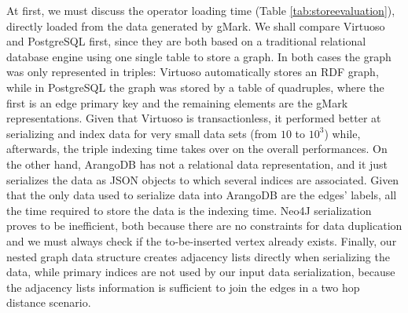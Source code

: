 At first, we must discuss the operator loading time (Table \ref{tab:storeevaluation}), directly loaded from the data generated by gMark. We shall  compare Virtuoso and PostgreSQL first, since they are both based on a traditional relational database engine using one single table to store a graph. In both cases the graph was only represented in triples: Virtuoso automatically stores an RDF graph, while in PostgreSQL the graph was stored by a table of quadruples, where the first is an edge primary key and the remaining elements are the gMark representations. Given that Virtuoso is transactionless, it performed better at serializing and index data for very small data sets (from $10$ to $10^3$) while, afterwards, the triple indexing time takes over on the overall performances. On the other hand, ArangoDB has not a relational data representation, and it just serializes the data as JSON objects to which several indices are associated. Given that the only data used to serialize data into ArangoDB are the edges' labels, all the time required to store the data is the indexing time. Neo4J serialization proves to be inefficient, both because there are no constraints for data duplication and we must always check if the to-be-inserted vertex already exists. Finally, our nested graph data structure creates adjacency lists directly when serializing the data, while primary indices are not used by our input data serialization, because the adjacency lists information is sufficient to join the edges in a two hop distance scenario.

